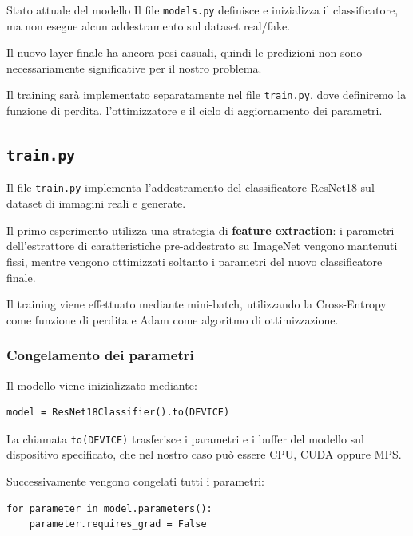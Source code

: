 \documentclass[10pt,a4paper,oneside]{book}
\begin{document}
\begin{warningbox}{Stato attuale del modello}
Il file \texttt{models.py} definisce e inizializza
il classificatore, ma non esegue alcun addestramento
sul dataset real/fake.

Il nuovo layer finale ha ancora pesi casuali,
quindi le predizioni non sono necessariamente
significative per il nostro problema.

Il training sarà implementato separatamente
nel file \texttt{train.py}, dove definiremo
la funzione di perdita, l'ottimizzatore
e il ciclo di aggiornamento dei parametri.
\end{warningbox}



\subsection{\texttt{train.py}}

Il file \texttt{train.py} implementa l'addestramento del
classificatore ResNet18 sul dataset di immagini reali e generate.

Il primo esperimento utilizza una strategia di
\textbf{feature extraction}: i parametri dell'estrattore
di caratteristiche pre-addestrato su ImageNet vengono
mantenuti fissi, mentre vengono ottimizzati soltanto
i parametri del nuovo classificatore finale.

Il training viene effettuato mediante mini-batch,
utilizzando la Cross-Entropy come funzione di perdita
e Adam come algoritmo di ottimizzazione.

\subsubsection{Congelamento dei parametri}

Il modello viene inizializzato mediante:

\begin{verbatim}
model = ResNet18Classifier().to(DEVICE)
\end{verbatim}

La chiamata \texttt{to(DEVICE)} trasferisce i parametri
e i buffer del modello sul dispositivo specificato,
che nel nostro caso può essere CPU, CUDA oppure MPS.

Successivamente vengono congelati tutti i parametri:

\begin{verbatim}
for parameter in model.parameters():
    parameter.requires_grad = False
\end{verbatim}
\end{document}
